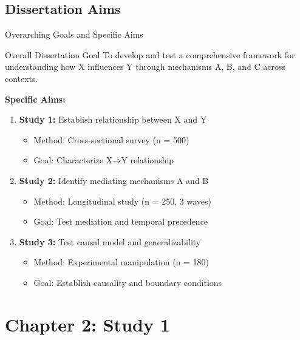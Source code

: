 \documentclass[aspectratio=169,12pt]{beamer}
\begin{document}
\subsection{Dissertation Aims}

\begin{frame}{Overarching Goals and Specific Aims}
  \begin{block}{Overall Dissertation Goal}
    To develop and test a comprehensive framework for understanding how X influences Y through mechanisms A, B, and C across contexts.
  \end{block}

  \vspace{0.5cm}

  \textbf{Specific Aims:}

  \begin{enumerate}
    \item \textbf{Study 1:} Establish relationship between X and Y
    \begin{itemize}
      \item Method: Cross-sectional survey (n = 500)
      \item Goal: Characterize X→Y relationship
    \end{itemize}

    \item \textbf{Study 2:} Identify mediating mechanisms A and B
    \begin{itemize}
      \item Method: Longitudinal study (n = 250, 3 waves)
      \item Goal: Test mediation and temporal precedence
    \end{itemize}

    \item \textbf{Study 3:} Test causal model and generalizability
    \begin{itemize}
      \item Method: Experimental manipulation (n = 180)
      \item Goal: Establish causality and boundary conditions
    \end{itemize}
  \end{enumerate}
\end{frame}


\section{Chapter 2: Study 1}
\end{document}
